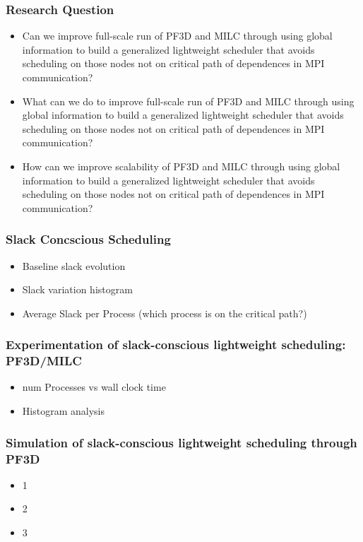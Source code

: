 \begin{frame} 
\frametitle{Research Question} 
\begin{itemize} 
\item \small Can we improve full-scale run of PF3D and MILC through using
 global information to build a generalized lightweight scheduler that
 avoids scheduling on those nodes not on critical path of dependences
in MPI communication? 

\item \small What can we do to improve full-scale run of PF3D and 
MILC through using global information to build a generalized
lightweight scheduler that avoids scheduling on those nodes not on
critical path of dependences in MPI communication? 

\item \small How can we improve scalability of PF3D and 
MILC through using global information to build a generalized
lightweight scheduler that avoids scheduling on those nodes not on
critical path of dependences in MPI communication? 
\end{itemize}

\end{frame}


\begin{frame}
\frametitle{Slack Concscious Scheduling}
\begin{itemize}
\item Baseline slack evolution
\item Slack variation histogram  
\item Average Slack per Process (which process is on the critical path?)
\end{itemize}
\end{frame}

\begin{frame}
\frametitle{Experimentation of slack-conscious lightweight scheduling:
  PF3D/MILC} 
\begin{itemize}
\item num Processes vs wall clock time 
\item Histogram analysis
\end{itemize}  
\end{frame}  


\begin{frame}
\frametitle{Simulation of slack-conscious lightweight scheduling
through PF3D} 
\begin{itemize}
\item 1
\item 2 
\item 3
\end{itemize}
\end{frame}


